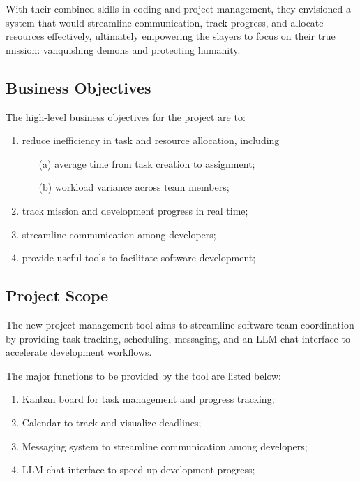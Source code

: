 \documentclass[11pt]{article}
\begin{document}
With their combined skills in coding and project management, they envisioned a system that
would streamline communication, track progress, and allocate resources effectively, ultimately
empowering the slayers to focus on their true mission: vanquishing demons and protecting
humanity.

\subsection{Business Objectives}
The high-level business objectives for the project are to:
\begin{enumerate}
    \item reduce inefficiency in task and resource allocation, including
    \begin{itemize}%
        \item[(a)] average time from task creation to assignment;
        \item[(b)] workload variance across team members;
    \end{itemize}
    \item track mission and development progress in real time;
    \item streamline communication among developers;
    \item provide useful tools to facilitate software development;
\end{enumerate}

\subsection{Project Scope}
The new project management tool aims to streamline software team coordination by 
providing task tracking, scheduling, messaging, and an LLM chat interface to accelerate
development workflows.

The major functions to be provided by the tool are listed below:
\begin{enumerate}
    \item Kanban board for task management and progress tracking;
    \item Calendar to track and visualize deadlines;
    \item Messaging system to streamline communication among developers;
    \item LLM chat interface to speed up development progress;
\end{enumerate}

\end{document}
